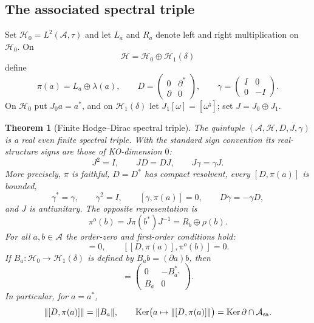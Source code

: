 \documentclass[11pt]{article}
\newtheorem{theorem}{Theorem}[section]
\theoremstyle{definition}
\theoremstyle{remark}
\theoremstyle{definition}
\theoremstyle{remark}
\newcommand{\Ker}{\operatorname{Ker}}
\newcommand{\A}{\mathcal A}
\newcommand{\Hh}{\mathcal H}
\begin{document}
\subsection{The associated spectral triple}

Set $\Hh_0=L^2(\A,\tau)$ and let $L_a$ and $R_a$ denote left and right
multiplication on $\Hh_0$.  On
\begin{equation}
 \Hh=\Hh_0\oplus\Hh_1(\delta)
 \label{eq:H-total}
\end{equation}
define
\begin{equation}
 \pi(a)=L_a\oplus\lambda(a),
 \qquad
 D=\begin{pmatrix}0&\partial^*\\ \partial&0\end{pmatrix},
 \qquad
 \gamma=\begin{pmatrix}I&0\\0&-I\end{pmatrix}.
 \label{eq:finite-D}
\end{equation}
On $\Hh_0$ put $J_0a=a^*$, and on $\Hh_1(\delta)$ let
$J_1[\omega]=[\omega^\natural]$; set $J=J_0\oplus J_1$.

\begin{theorem}[Finite Hodge--Dirac spectral triple]
\label{thm:finite-Hodge-Dirac}
The quintuple $(\A,\Hh,D,J,\gamma)$ is a real even finite spectral triple.  With the
standard sign convention its real-structure signs are those of KO-dimension $0$:
\begin{equation}
 J^2=I,\qquad JD=DJ,\qquad J\gamma=\gamma J.
 \label{eq:KO-zero-signs}
\end{equation}
More precisely, $\pi$ is faithful, $D=D^*$ has compact resolvent, every
$[D,\pi(a)]$ is bounded,
\begin{equation}
 \gamma^*=\gamma,\qquad \gamma^2=I,\qquad
 [\gamma,\pi(a)]=0,\qquad D\gamma=-\gamma D,
 \label{eq:even-grading-axioms}
\end{equation}
and $J$ is antiunitary.  The opposite representation is
\[
 \pi^o(b)=J\pi(b^*)J^{-1}=R_b\oplus\rho(b).
\]
For all $a,b\in\A$ the order-zero and first-order conditions hold:
\begin{equation}
 [\pi(a),\pi^o(b)]=0,
 \qquad
 [[D,\pi(a)],\pi^o(b)]=0.
 \label{eq:order-zero-first}
\end{equation}
If $B_a:\Hh_0\to\Hh_1(\delta)$ is defined by
$B_ab=(\partial a)b$, then
\begin{equation}
 [D,\pi(a)]
 =\begin{pmatrix}0&-B_{a^*}^*\\B_a&0\end{pmatrix}.
 \label{eq:finite-commutator}
\end{equation}
In particular, for $a=a^*$,
\begin{equation}
 \|[D,\pi(a)]\|=\|B_a\|,
 \qquad
 \Ker\bigl(a\mapsto\|[D,\pi(a)]\|\bigr)=\Ker\partial\cap\A_{\rm sa}.
 \label{eq:finite-Lip}
\end{equation}
\end{theorem}
\end{document}
